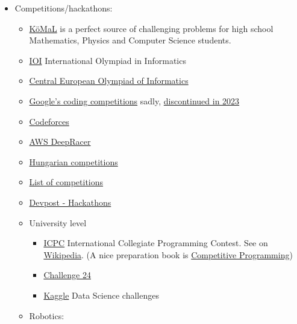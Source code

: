 \documentclass{article}
\begin{document}
\begin{itemize}
    
    \item Competitions/hackathons:
    \begin{itemize}
        \item \href{https://www.komal.hu/home.e.shtml}{KöMaL} is a perfect source of challenging problems for high school Mathematics, Physics and Computer Science students.
        \item \href{https://ioinformatics.org/}{IOI} International Olympiad in Informatics
        \item \href{http://ceoi.inf.elte.hu/}{Central European Olympiad of Informatics}
        \item \href{https://web.archive.org/web/20230329043437/https://codingcompetitions.withgoogle.com/}{Google's coding competitions} sadly, \href{https://blog.pragmaticengineer.com/google-coding-competitions/}{discontinued in 2023}
        \item \href{https://codeforces.com/}{Codeforces}
        \item \href{https://aws.amazon.com/deepracer/}{AWS DeepRacer}
        \item \href{http://informatika.fazekas.hu/informatika-versenyek-201920/}{Hungarian competitions}
        \item \href{https://www.mycplus.com/featured-articles/programming-contests-and-challenges/}{List of competitions}
        \item \href{https://devpost.com/hackathons}{Devpost - Hackathons}
        \item University level
        \begin{itemize}
            \item \href{https://icpc.global/}{ICPC} International Collegiate Programming Contest. See on \href{https://en.wikipedia.org/wiki/International_Collegiate_Programming_Contest}{Wikipedia}. (A nice preparation book is \href{https://www.goodreads.com/book/show/22820951-competitive-programming}{Competitive Programming})
            \item \href{http://www.challenge24.org/}{Challenge 24}
            \item \href{https://www.kaggle.com/}{Kaggle} Data Science challenges
        \end{itemize}
        \item Robotics:
        \begin{itemize}

\end{itemize}
\end{itemize}
\end{itemize}
\end{document}
